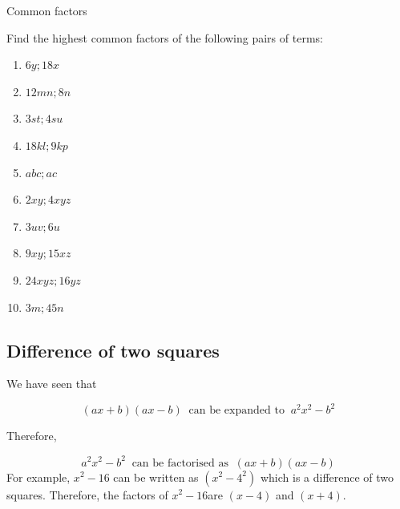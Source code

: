 \begin{exercises}{Common factors}

Find the highest common factors of the
following pairs of terms:\par

\begin{multicols}{2}
\begin{enumerate}[label=\textbf{\arabic*}., itemsep=5pt]
\item $6y;18x$
\item $12mn;8n$
\item $3st;4su$ 
\item $18kl;9kp$
\item $abc;ac$%
\item $2xy;4xyz$
\item $3uv;6u$ 
\item $9xy;15xz$
\item $24xyz;16yz$
\item $3m;45n$
\end{enumerate}
\end{multicols}



\end{exercises}
    \par
        \label{m39383*uid7}
           \subsection* { Difference of two squares}
            \nopagebreak
          \label{m39383*id269179}We have seen that\par 
          \label{m39383*uid8}\nopagebreak\noindent{}
            
    \begin{equation}
    \left(ax+b\right)\left(ax-b\right)~\mbox{ can be expanded to }~{a}^{2}{x}^{2}-{b}^{2}
      \end{equation}

          \label{m39383*id269338}Therefore,\par 
          \label{m39383*id269343}\nopagebreak\noindent{}
            
    \begin{equation}
    {a}^{2}{x}^{2}-{b}^{2}~\mbox{ can be factorised as }~\left(ax+b\right)\left(ax-b\right)
      \end{equation}
          \label{m39383*id269408}For example, ${x}^{2}-16$\hspace{1ex} can be written as $\left({x}^{2}-{4}^{2}\right)$ which is a difference of two squares. Therefore, the factors of ${x}^{2}-16$\hspace{1ex}are $\left(x-4\right)$ and $\left(x+4\right)$.\par 


